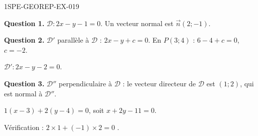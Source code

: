 \begin{corrige}{1SPE-GEOREP-EX-019}

\textbf{Question 1.} $\mathcal{D} : 2x - y - 1 = 0$. Un vecteur normal est $\vec{n}(2 ; -1)$.

\textbf{Question 2.} $\mathcal{D}'$ parallèle à $\mathcal{D}$ : $2x - y + c = 0$. En $P(3 ; 4)$ : $6 - 4 + c = 0$, $c = -2$.

$\boxed{\mathcal{D}' : 2x - y - 2 = 0}$.

\textbf{Question 3.} $\mathcal{D}''$ perpendiculaire à $\mathcal{D}$ : le vecteur directeur de $\mathcal{D}$ est $(1 ; 2)$, qui est normal à $\mathcal{D}''$.

$1(x - 3) + 2(y - 4) = 0$, soit $\boxed{x + 2y - 11 = 0}$.

Vérification : $2 \times 1 + (-1) \times 2 = 0$ \checkmark.

\end{corrige}
